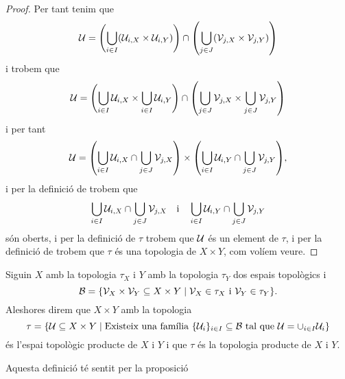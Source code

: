 \documentclass[../Apunts.tex]{subfiles}
\begin{document}
\begin{proposition}
\begin{proof}
			Per tant tenim que
			\[\obert{U}=\left(\bigcup_{i\in I}\left(\obert{U}_{i,X}\times\obert{U}_{i,Y}\right)\right)\cap\left(\bigcup_{j\in J}\left(\obert{V}_{j,X}\times\obert{V}_{j,Y}\right)\right)\]
			i trobem que
			\[\obert{U}=\left(\bigcup_{i\in I}\obert{U}_{i,X}\times\bigcup_{i\in I}\obert{U}_{i,Y}\right)\cap\left(\bigcup_{j\in J}\obert{V}_{j,X}\times\bigcup_{j\in J}\obert{V}_{j,Y}\right)\]
			i per tant
			\[\obert{U}=\left(\bigcup_{i\in I}\obert{U}_{i,X}\cap\bigcup_{j\in J}\obert{V}_{j,X}\right)\times\left(\bigcup_{i\in I}\obert{U}_{i,Y}\cap\bigcup_{j\in J}\obert{V}_{j,Y}\right),\]
			i per la definició de  trobem que
			\[\bigcup_{i\in I}\mathcal{U}_{i,X}\cap\bigcup_{j\in J}\mathcal{V}_{j,X}\quad\text{i}\quad\bigcup_{i\in I}\mathcal{U}_{i,Y}\cap\bigcup_{j\in J}\mathcal{V}_{j,Y}\]
			són oberts, i per la definició de \(\tau\) trobem que \(\mathcal{U}\) és un element de \(\tau\), i per la definició de  trobem que \(\tau\) és una topologia de \(X\times Y\), com volíem veure.
		\end{proof}
	\end{proposition}
	\begin{definition}
		\label{def:topologia producte}
		Siguin \(X\) amb la topologia \(\tau_{X}\) i \(Y\) amb la topologia \(\tau_{Y}\) dos espais topològics i
		\[\mathcal{B}=\{\mathcal{V}_{X}\times\mathcal{V}_{Y}\subseteq X\times Y\mid\mathcal{V}_{X}\in\tau_{X}\text{ i }\mathcal{V}_{Y}\in\tau_{Y}\}.\]
		Aleshores direm que \(X\times Y\) amb la topologia
		\[\tau=\{\mathcal{U}\subseteq X\times Y\mid\text{Existeix una família }\{\mathcal{U}_{i}\}_{i\in I}\subseteq\mathcal{B}\text{ tal que }\mathcal{U}=\cup_{i\in I}\mathcal{U}_{i}\}\]
		és l'espai topològic producte de \(X\) i \(Y\) i que \(\tau\) és la topologia producte de \(X\) i \(Y\).
		
		Aquesta definició té sentit per la proposició 
	\end{definition}
\end{document}
